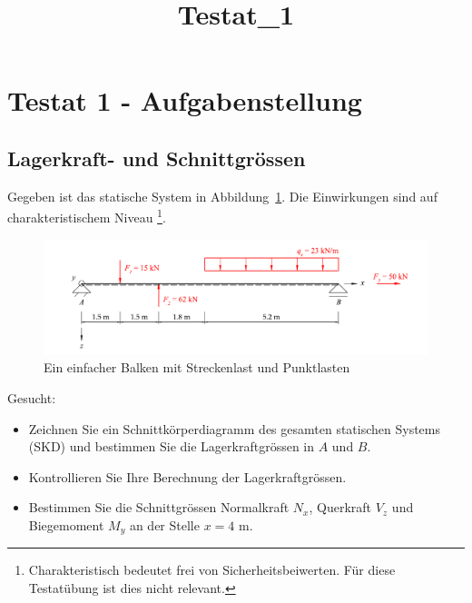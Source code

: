 \documentclass[
  12pt,
  letterpaper,
  DIV=11,
  egregdoesnotlikesansseriftitles]{scrartcl}
\title{Testat\_1}
\author{}
\date{}
\providecommand{\tightlist}{%
  \setlength{\itemsep}{0pt}\setlength{\parskip}{0pt}}\usepackage{longtable,booktabs,array}
\renewcommand{\maketitle}{}
\begin{document}
\maketitle
\ifdefined\Shaded\renewenvironment{Shaded}{\begin{tcolorbox}[enhanced, sharp corners, interior hidden, borderline west={3pt}{0pt}{shadecolor}, boxrule=0pt, frame hidden, breakable]}{\end{tcolorbox}}\fi

\hypertarget{testat-1---aufgabenstellung}{%
\section{Testat 1 -
Aufgabenstellung}\label{testat-1---aufgabenstellung}}

\hypertarget{lagerkraft--und-schnittgruxf6ssen}{%
\subsection{Lagerkraft- und
Schnittgrössen}\label{lagerkraft--und-schnittgruxf6ssen}}

Gegeben ist das statische System in Abbildung~\ref{fig-system}. Die
Einwirkungen sind auf charakteristischem Niveau \footnote{Charakteristisch
  bedeutet frei von Sicherheitsbeiwerten. Für diese Testatübung ist dies
  nicht relevant.}.

\begin{figure}[H]

{\centering \includegraphics{BSI_HS23_Testat_01_files/mediabag/../images/Testat_01_HS23.pdf}

}

\caption{\label{fig-system}Ein einfacher Balken mit Streckenlast und
Punktlasten}

\end{figure}

Gesucht:

\begin{itemize}
\tightlist
\item
  Zeichnen Sie ein Schnittkörperdiagramm des gesamten statischen Systems
  (SKD) und bestimmen Sie die Lagerkraftgrössen in \(A\) und \(B\).
\item
  Kontrollieren Sie Ihre Berechnung der Lagerkraftgrössen.
\item
  Bestimmen Sie die Schnittgrössen Normalkraft \(N_x\), Querkraft
  \(V_z\) und Biegemoment \(M_y\) an der Stelle \(x=4\) m.
\end{itemize}
\end{document}
